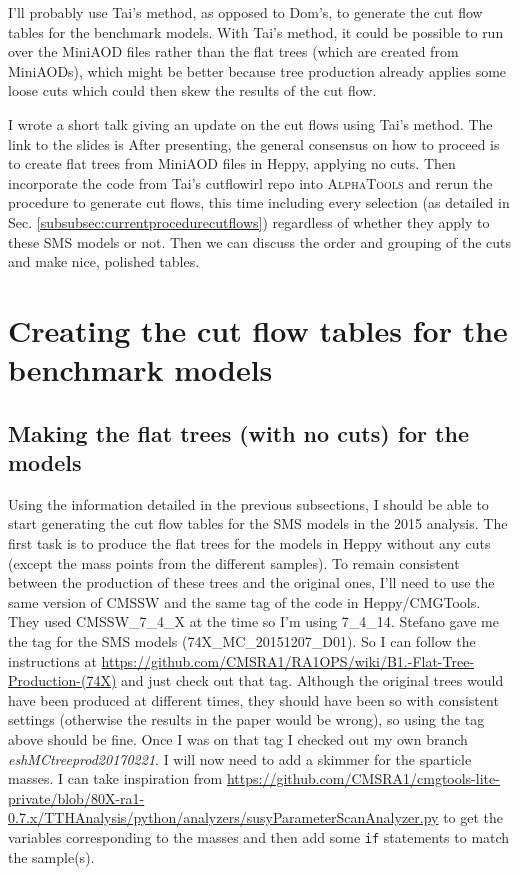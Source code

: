 I'll probably use Tai's method, as opposed to Dom's, to generate the cut flow tables for the benchmark models. With Tai's method, it could be possible to run over the MiniAOD files rather than the flat trees (which are created from MiniAODs), which might be better because tree production already applies some loose cuts which could then skew the results of the cut flow.  

I wrote a short talk giving an update on the cut flows using Tai's method. The link to the slides is %
After presenting, the general consensus on how to proceed is to create flat trees from MiniAOD files in Heppy, applying no cuts. Then incorporate the code from Tai's cutflowirl repo into \textsc{AlphaTools} and rerun the procedure to generate cut flows, this time including every selection (as detailed in Sec. \ref{subsubsec:currentprocedurecutflows}) regardless of whether they apply to these SMS models or not. Then we can discuss the order and grouping of the cuts and make nice, polished tables.

\section{Creating the cut flow tables for the benchmark models}

\subsection{Making the flat trees (with no cuts) for the models}

Using the information detailed in the previous subsections, I should be able to start generating the cut flow tables for the SMS models in the 2015 analysis. The first task is to produce the flat trees for the models in Heppy without any cuts (except the mass points from the different samples). To remain consistent between the production of these trees and the original ones, I'll need to use the same version of CMSSW and the same tag of the code in Heppy/CMGTools. They used CMSSW\_7\_4\_X at the time so I'm using 7\_4\_14. Stefano gave me the tag for the SMS models (74X\_MC\_20151207\_D01). So I can follow the instructions at \url{https://github.com/CMSRA1/RA1OPS/wiki/B1.-Flat-Tree-Production-(74X)} and just check out that tag. Although the original trees would have been produced at different times, they should have been so with consistent settings (otherwise the results in the paper would be wrong), so using the tag above should be fine. Once I was on that tag I checked out my own branch \emph{eshMCtreeprod20170221}. I will now need to add a skimmer for the sparticle masses. I can take inspiration from \url{https://github.com/CMSRA1/cmgtools-lite-private/blob/80X-ra1-0.7.x/TTHAnalysis/python/analyzers/susyParameterScanAnalyzer.py} to get the variables corresponding to the masses and then add some \verb!if! statements to match the sample(s).

